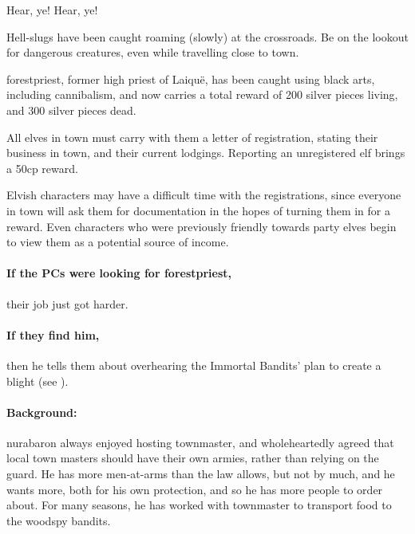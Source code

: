 \begin{multicols}{2}
\begin{speechtext}
  Hear, ye! Hear, ye!

  Hell-slugs have been caught roaming (slowly) at the crossroads.
  Be on the lookout for dangerous creatures, even while travelling close to \gls{town}.

  \Gls{forestpriest}, former high priest of Laiqu\"{e}, has been caught using black arts, including cannibalism, and now carries a total reward of 200 silver pieces living, and 300 silver pieces dead.

  All elves in \gls{town} must carry with them a letter of registration, stating their business in town, and their current lodgings.
  Reporting an unregistered elf brings a 50cp reward.

\end{speechtext}

Elvish characters may have a difficult time with the registrations, since everyone in \gls{town} will ask them for documentation in the hopes of turning them in for a reward.
Even characters who were previously friendly towards party elves begin to view them as a potential source of income.

\paragraph{If the PCs were looking for \gls{forestpriest},}
their job just got harder.

\paragraph{If they find him,}
then he tells them about overhearing the Immortal Bandits' plan to create a \gls{blight} (see ).

\stopcontents[sq]

\resumecontents[Town]

\label{desperatemeasures}

\stopcontents[Town]

\startcontents[sq]

\sqminitoc
\paragraph{Background:}
\gls{nurabaron} always enjoyed hosting \gls{townmaster}, and wholeheartedly agreed that local town masters should have their own armies, rather than relying on the \gls{guard}.
He has more men-at-arms than the law allows, but not by much, and he wants more, both for his own protection, and so he has more people to order about.
For many seasons, he has worked with \gls{townmaster} to transport food to the woodspy bandits.


\end{multicols}
